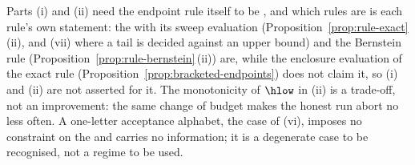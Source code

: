 
Parts (i) and (ii) need the endpoint rule itself to be
, and which rules are is each rule's own
statement: the  with its
sweep evaluation (Proposition~\ref{prop:rule-exact}\,(ii), and (vii) where
a tail is decided against an upper bound) and the Bernstein
rule (Proposition~\ref{prop:rule-bernstein}\,(ii)) are, while the enclosure
evaluation of the exact rule (Proposition~\ref{prop:bracketed-endpoints})
does not claim it, so (i) and (ii) are not asserted for it. The monotonicity
of $\hlow$ in (ii) is a trade-off, not an improvement: the same change of
budget makes the honest run abort no less often. A one-letter acceptance
alphabet, the case of (vi), imposes no constraint on the  and
carries no information; it is a degenerate case to be recognised, not a
regime to be used.

